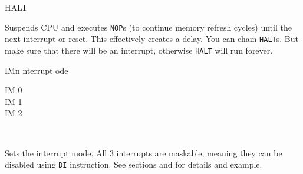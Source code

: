 \begin{basedescript}{
	\desclabelstyle{\multilinelabel}
	\desclabelwidth{3cm}}
	\begin{DetailItem}{HALT}{}
		{}
		{}

		Suspends CPU and executes {\tt NOP}s (to continue memory refresh cycles) until the next interrupt or reset. This effectively creates a delay. You can chain {\tt HALT}s. But make sure that there will be an interrupt, otherwise {\tt HALT} will run forever.

		\begin{DetailEffects}
			\FlagsHALT
		\end{DetailEffects}
						
		\begin{DetailTiming}
			\DetailTime{1}{4}
		\end{DetailTiming}

	\end{DetailItem}


	\begin{DetailItem}{IM}{n}
		{nterrupt \IH{M}ode}
		{}

		\begin{DetailVariants}[2]
			IM 0\\
			IM 1\\
			IM 2
			
			\columnbreak
			~
		\end{DetailVariants}

		Sets the interrupt mode. All 3 interrupts are maskable, meaning they can be disabled using {\tt DI} instruction. See sections  and  for details and example.

		\begin{DetailEffects}
			\FlagsIM		
		\end{DetailEffects}

		\begin{DetailTiming}
			\DetailTime{2}{8}
		\end{DetailTiming}

	\end{DetailItem}


\end{basedescript}
